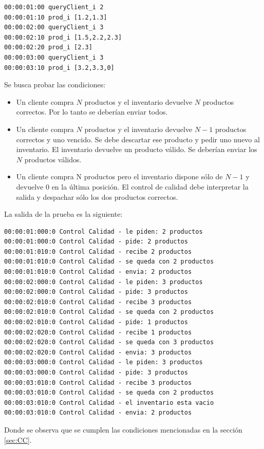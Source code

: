 \documentclass[10pt]{article}
\begin{document}
\begin{minipage}{1\textwidth}
	\centering
	\begin{lstlisting}
00:00:01:00 queryClient_i 2
00:00:01:10 prod_i [1.2,1.3]
00:00:02:00 queryClient_i 3
00:00:02:10 prod_i [1.5,2.2,2.3]
00:00:02:20 prod_i [2.3]
00:00:03:00 queryClient_i 3
00:00:03:10 prod_i [3.2,3.3,0]
	\end{lstlisting}
\end{minipage}

Se busca probar las condiciones:
\begin{itemize}
	\item Un cliente compra $N$ productos y el inventario devuelve $N$ productos correctos. Por lo tanto se deberían enviar todos.
	\item Un cliente compra $N$ productos y el inventario devuelve $N-1$ productos correctos y uno vencido. Se debe descartar ese producto y pedir uno nuevo al inventario. El inventario devuelve un producto válido. Se deberían enviar los $N$ productos válidos.
	\item Un cliente compra N productos pero el inventario dispone sólo de $N-1$ y devuelve $0$ en la última posición. El control de calidad debe interpretar la salida y despachar sólo los dos productos correctos.
\end{itemize}

La salida de la prueba es la siguiente:

\centering
\begin{minipage}{1\textwidth}
	\centering
	\begin{lstlisting}
00:00:01:000:0 Control Calidad - le piden: 2 productos
00:00:01:000:0 Control Calidad - pide: 2 productos
00:00:01:010:0 Control Calidad - recibe 2 productos
00:00:01:010:0 Control Calidad - se queda con 2 productos
00:00:01:010:0 Control Calidad - envia: 2 productos
00:00:02:000:0 Control Calidad - le piden: 3 productos
00:00:02:000:0 Control Calidad - pide: 3 productos
00:00:02:010:0 Control Calidad - recibe 3 productos
00:00:02:010:0 Control Calidad - se queda con 2 productos
00:00:02:010:0 Control Calidad - pide: 1 productos
00:00:02:020:0 Control Calidad - recibe 1 productos
00:00:02:020:0 Control Calidad - se queda con 3 productos
00:00:02:020:0 Control Calidad - envia: 3 productos
00:00:03:000:0 Control Calidad - le piden: 3 productos
00:00:03:000:0 Control Calidad - pide: 3 productos
00:00:03:010:0 Control Calidad - recibe 3 productos
00:00:03:010:0 Control Calidad - se queda con 2 productos
00:00:03:010:0 Control Calidad - el inventario esta vacio
00:00:03:010:0 Control Calidad - envia: 2 productos
	\end{lstlisting}
	
\end{minipage}
Donde se observa que se cumplen las condiciones mencionadas en la sección \ref{sec:CC}.
\end{document}

